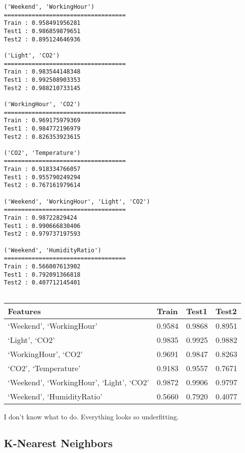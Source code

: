 \documentclass[11pt]{article}
\begin{document}
    \begin{Verbatim}[commandchars=\\\{\}]
('Weekend', 'WorkingHour')
===================================
Train : 0.958491956281
Test1 : 0.986859879651
Test2 : 0.895124646936

('Light', 'CO2')
===================================
Train : 0.983544148348
Test1 : 0.992508903353
Test2 : 0.988210733145

('WorkingHour', 'CO2')
===================================
Train : 0.969175979369
Test1 : 0.984772196979
Test2 : 0.826353923615

('CO2', 'Temperature')
===================================
Train : 0.918334766057
Test1 : 0.955790249294
Test2 : 0.767161979614

('Weekend', 'WorkingHour', 'Light', 'CO2')
===================================
Train : 0.98722829424
Test1 : 0.990666830406
Test2 : 0.979737197593

('Weekend', 'HumidityRatio')
===================================
Train : 0.566007613902
Test1 : 0.792091366818
Test2 : 0.407712145401


    \end{Verbatim}

    \begin{longtable}[]{@{}llll@{}}
\toprule
Features & Train & Test1 & Test2\tabularnewline
\midrule
\endhead
`Weekend', `WorkingHour' & 0.9584 & 0.9868 & 0.8951\tabularnewline
`Light', `CO2' & 0.9835 & 0.9925 & 0.9882\tabularnewline
`WorkingHour', `CO2' & 0.9691 & 0.9847 & 0.8263\tabularnewline
`CO2', `Temperature' & 0.9183 & 0.9557 & 0.7671\tabularnewline
`Weekend', `WorkingHour', `Light', `CO2' & 0.9872 & 0.9906 &
0.9797\tabularnewline
`Weekend', `HumidityRatio' & 0.5660 & 0.7920 & 0.4077\tabularnewline
\bottomrule
\end{longtable}

    I don't know what to do. Everything looks so underfitting.

    \hypertarget{k-nearest-neighbors}{%
\subsection{K-Nearest Neighbors}\label{k-nearest-neighbors}}
\end{document}
